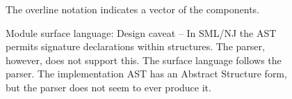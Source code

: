 \begin{figure}
\centering
\fixedCodeFrame{
\small
\[
\setlength{\tabcolsep}{0ex}
\renewcommand{\arraystretch}{1.1}
\begin{array}{rcll}
	d & ::= &\signature~s=\sig{\overline{spec}}\\
	  & ~~\bnfalt& \local~\overline{d}~\inx~\overline{d}~\en\\
	  & ~~\bnfalt&~ld\\
	ld & ::= & \structure~X~=~m\\
	   & ~~\bnfalt&\functor~F\overline{(X:sigexp)}~cnstr = m\\
	   & ~~\bnfalt&\val~x=e~\bnfalt~\type~\overline{\alpha}~t=\tau\\
	   & ~~\bnfalt&\local~\overline{ld}~\inx~\overline{ld}~\en\\
	   & ~~\bnfalt&\open~\overline{q}\\
	m & ::= & q~\bnfalt~\struct{\overline{ld}}~\bnfalt~q~arg~\bnfalt~\letx~\overline{d}~\inx~m~\en\\
	  & ~~\bnfalt~&~m:sigexp~\bnfalt~m:>sigexp\\
	arg & ::= & ( \overline{d} )~\overline{arg}~\bnfalt~(m)~arg~\bnfalt~(m)~\bnfalt~(\overline{d})\\
	cnstr & ::= & :~sigexp~\bnfalt~:>~sigexp\\
	sigexp & ::= & s~\bnfalt~\sig{\overline{spec}}~\bnfalt~sigexp~\where~\type~\overline{\alpha}~q=\tau\\
	spec & ::= & \structure~q:sigexp[=q]\\
	     & ~~\bnfalt &\functor~q~\overline{(X:sigexp)} : sigexp\\
	     & ~~\bnfalt &\type~\overline{\alpha}~t[=\tau]~\bnfalt~\val~x:\tau~\bnfalt~\sharing~\type~p=p\\
	     & ~~\bnfalt &\sharing~p=p~\bnfalt~\exception~exn\\
	     & ~~\bnfalt & \eqtype~\overline{\alpha}~t[=\tau]\\
	\tau & ::= & \tau\rightarrow\tau~\bnfalt~\Int~\bnfalt~t\\
\end{array}
\]
}
The overline notation indicates a vector of the components. 
\caption{Module surface language: Design caveat -- In SML/NJ the AST permits signature declarations within structures. The parser, however, does not support this. The surface language follows the parser. The implementation AST has an Abstract Structure form, but the parser does not seem to ever produce it. }
\label{fig:pureml}
\end{figure}